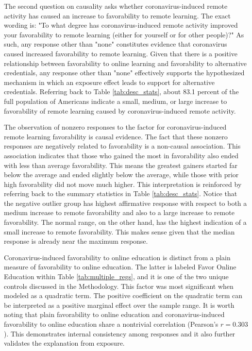 \documentclass[review]{elsarticle}
\begin{document}
The second question on causality asks whether coronavirus-induced remote activity has caused an increase
to favorability to remote learning.
The exact wording is:
"To what degree has coronavirus-induced remote activity improved your favorability to remote learning
(either for yourself or for other people)?"
As such, any response other than "none" constitutes evidence that coronavirus caused increased favorability to remote learning.
Given that there is a positive relationship between favorability to online learning and favorability to alternative credentials,
any response other than "none" effectively supports the hypothesized mechanism in which an exposure effect leads to support for alternative credentials.
Referring back to Table \ref{tab:desc_stats},
about 83.1 percent of the full population of Americans indicate a small,
medium, or large increase to favorability of remote learning
caused by coronavirus-induced remote activity.

The observation of nonzero responses to the factor for coronavirus-induced remote learning favorability is causal evidence.
The fact that these nonzero responses are negatively related to favorability is a non-causal association.
This association indicates that those who gained the most in favorability also ended with less than average favorability.
This means the greatest gainers started far below the average and ended slightly below the average,
while those with prior high favorability did not move much higher.
This interpretation is reinforced by referring back to the summary statistics in Table \ref{tab:desc_stats}.
Notice that the negative outlier group has highest affirmative response with respect to both a
medium increase to remote favorability
and also to a large increase to remote favorability.
The normal range, on the other hand, has the highest indication of a small increase to remote favorability.
This makes sense given that the median response is already near the maximum response.

Coronavirus-induced favorability to online education is distinct from a plain measure of favorability to online education.
The latter is labeled Favor Online Education within Table \ref{tab:multiple_regs},
and it is one of the two unique controls discussed in the Methodology.
This factor was most significant when modeled as a quadratic term.
The positive coefficient on the quadratic term can be interpreted as a positive marginal effect over the sample range.
It is worth noting that plain favorability to online education
and coronavirus-induced favorability to online education share a nontrivial correlation (Pearson's $r=0.303$).
This demonstrates internal consistency among responses and it also further validates the explanation from exposure.
\end{document}
